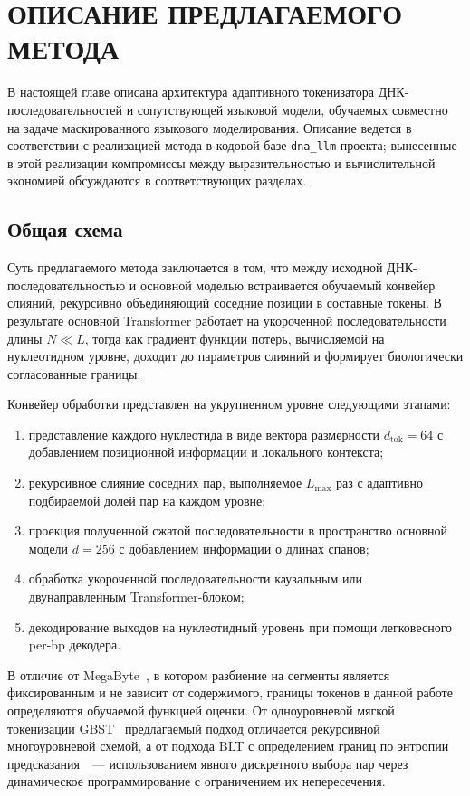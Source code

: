 \chapter{ОПИСАНИЕ ПРЕДЛАГАЕМОГО МЕТОДА}

В настоящей главе описана архитектура адаптивного токенизатора
ДНК-последовательностей и сопутствующей языковой модели, обучаемых
совместно на задаче маскированного языкового моделирования. Описание
ведется в соответствии с реализацией метода в кодовой базе
\texttt{dna\_llm} проекта; вынесенные в этой реализации компромиссы
между выразительностью и вычислительной экономией обсуждаются в
соответствующих разделах.

\section{Общая схема}

Суть предлагаемого метода заключается в том, что между исходной
ДНК-последовательностью и основной моделью встраивается обучаемый
конвейер слияний, рекурсивно объединяющий соседние позиции в составные
токены. В результате основной Transformer работает на укороченной
последовательности длины $N \ll L$, тогда как градиент функции потерь,
вычисляемой на нуклеотидном уровне, доходит до параметров слияний и
формирует биологически согласованные границы.

Конвейер обработки представлен на укрупненном уровне следующими
этапами:
\begin{enumerate}
\item представление каждого нуклеотида в виде вектора размерности
  $d_{\text{tok}} = 64$ с добавлением позиционной информации и
  локального контекста;
\item рекурсивное слияние соседних пар, выполняемое $L_{\max}$ раз с
  адаптивно подбираемой долей пар на каждом уровне;
\item проекция полученной сжатой последовательности в пространство
  основной модели $d = 256$ с добавлением информации о длинах спанов;
\item обработка укороченной последовательности каузальным или
  двунаправленным Transformer-блоком;
\item декодирование выходов на нуклеотидный уровень при помощи
  легковесного per-bp декодера.
\end{enumerate}

В отличие от MegaByte~\cite{yuMegaBytePredictingMillionbyte2023}, в
котором разбиение на сегменты является фиксированным и не зависит от
содержимого, границы токенов в данной работе определяются обучаемой
функцией оценки. От одноуровневой мягкой токенизации
GBST~\cite{tayCharformerFastCharacter2022} предлагаемый подход
отличается рекурсивной многоуровневой схемой, а от подхода BLT с
определением границ по энтропии
предсказания~\cite{bltByteLatentTransformer2024}~--- использованием
явного дискретного выбора пар через динамическое программирование с
ограничением их непересечения.

